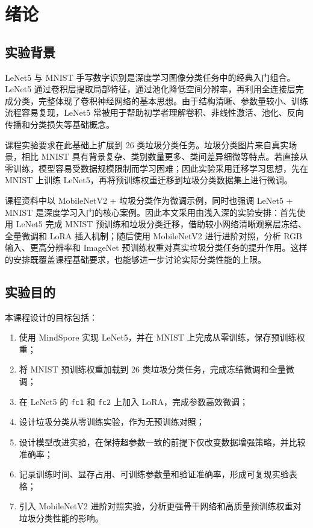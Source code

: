\chapter{绪论}\label{chap:intro}

\section{实验背景}

LeNet5 与 MNIST 手写数字识别是深度学习图像分类任务中的经典入门组合。LeNet5 通过卷积层提取局部特征，通过池化降低空间分辨率，再利用全连接层完成分类，完整体现了卷积神经网络的基本思想。由于结构清晰、参数量较小、训练流程容易复现，LeNet5 常被用于帮助初学者理解卷积、非线性激活、池化、反向传播和分类损失等基础概念。

课程实验要求在此基础上扩展到 26 类垃圾分类任务。垃圾分类图片来自真实场景，相比 MNIST 具有背景复杂、类别数量更多、类间差异细微等特点。若直接从零训练，模型容易受数据规模限制而学习困难；因此实验采用迁移学习思想，先在 MNIST 上训练 LeNet5，再将预训练权重迁移到垃圾分类数据集上进行微调。

课程资料中以 MobileNetV2 + 垃圾分类作为微调示例，同时也强调 LeNet5 + MNIST 是深度学习入门的核心案例。因此本文采用由浅入深的实验安排：首先使用 LeNet5 完成 MNIST 预训练和垃圾分类迁移，借助较小网络清晰观察层冻结、全量微调和 LoRA 插入机制；随后使用 MobileNetV2 进行进阶对照，分析 RGB 输入、更高分辨率和 ImageNet 预训练权重对真实垃圾分类任务的提升作用。这样的安排既覆盖课程基础要求，也能够进一步讨论实际分类性能的上限。

\section{实验目的}

本课程设计的目标包括：

\begin{enumerate}[label=(\arabic*)]
  \item 使用 MindSpore 实现 LeNet5，并在 MNIST 上完成从零训练，保存预训练权重；
  \item 将 MNIST 预训练权重加载到 26 类垃圾分类任务，完成冻结微调和全量微调；
  \item 在 LeNet5 的 \texttt{fc1} 和 \texttt{fc2} 上加入 LoRA，完成参数高效微调；
  \item 设计垃圾分类从零训练实验，作为无预训练对照；
  \item 设计模型改进实验，在保持超参数一致的前提下仅改变数据增强策略，并比较准确率；
  \item 记录训练时间、显存占用、可训练参数量和验证准确率，形成可复现实验表格；
  \item 引入 MobileNetV2 进阶对照实验，分析更强骨干网络和高质量预训练权重对垃圾分类性能的影响。
\end{enumerate}


